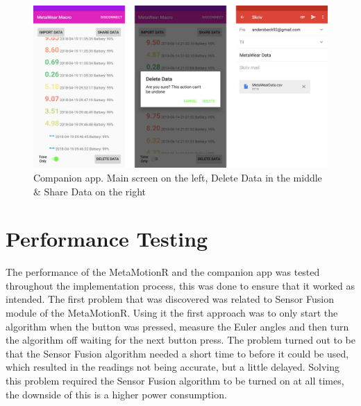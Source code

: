 \begin{figure}[h!]
    \centering
    \includegraphics[width=1.1\textwidth]{figures/proto_s1.png}
    \caption{Companion app. Main screen on the left, Delete Data in the middle \& Share Data on the right}
    \label{proto_s1}
\end{figure}



\section{Performance Testing}
The performance of the MetaMotionR and the companion app was tested throughout the implementation process, this was done to ensure that it worked as intended. The first problem that was discovered was related to Sensor Fusion module of the MetaMotionR. Using it the first approach was to only start the algorithm when the button was pressed, measure the Euler angles and then turn the algorithm off waiting for the next button press. The problem turned out to be that the Sensor Fusion algorithm needed a short time to  before it could be used, which resulted in the readings not being accurate, but a little delayed. Solving this problem required the Sensor Fusion algorithm to be turned on at all times, the downside of this is a higher power consumption.

